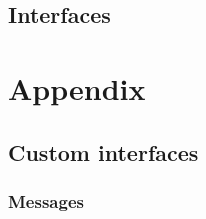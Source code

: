 
\subsection{Interfaces}



\section{Appendix}

\subsection{Custom interfaces}

\subsubsection{Messages}

